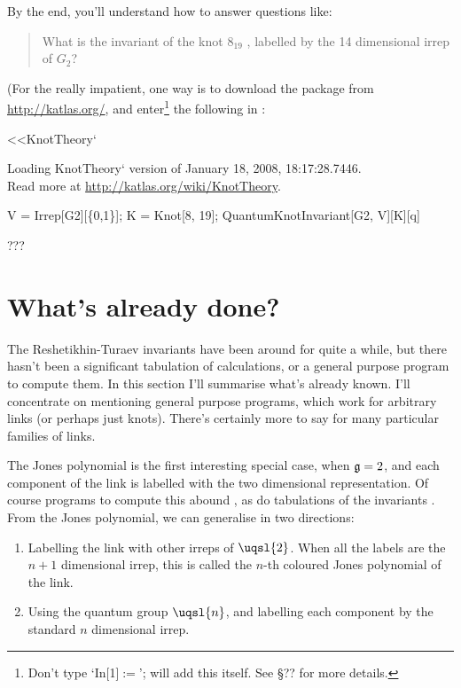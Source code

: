 By the end, you'll understand how to answer questions like:
\begin{quote}
What is the invariant of the knot $8_{19}$ , labelled by
the 14 dimensional irrep of $G_2$?
\end{quote}
(For the really impatient, one way is to download the 
\MMA package from \url{http://katlas.org/}, and enter\footnote{Don't type `{\color{blue}In[1]$:=$}'; \MMA will add this itself. See \S ?? for more details.} the following in \MMA:
\begin{mma}
\begin{inm}<<KnotTheory`\end{inm}
\begin{printm}Loading KnotTheory` version of January 18, 2008, 18:17:28.7446. \\
Read more at \url{http://katlas.org/wiki/KnotTheory}.
\end{printm}
\begin{inm}V = Irrep[G2][\{0,1\}]; K = Knot[8, 19];
QuantumKnotInvariant[G2, V][K][q]\end{inm} 
\begin{outm}???\end{outm}
\end{mma}

\section{What's already done?}
The Reshetikhin-Turaev invariants have been around for quite a while, but
there hasn't been a significant tabulation of calculations, or a general
purpose program to compute them. In this section I'll summarise what's
already known. I'll concentrate on mentioning general purpose programs,
which work for arbitrary links (or perhaps just knots). There's certainly
more to say for many particular families of links.

The Jones polynomial \cite{???} is the first interesting special case,
when $\mathfrak{g}=\sl{2}$, and each component of the link is labelled
with the two dimensional representation. Of course programs to compute
this abound \cite{???}, as do tabulations of the invariants \cite{???}.
From the Jones polynomial, we can generalise in two directions:
\begin{enumerate}
\item Labelling the link with other irreps of $\uqsl{2}$. When all the
labels are the $n+1$ dimensional irrep, this is called the $n$-th
coloured Jones polynomial of the link.
\item Using the quantum group $\uqsl{n}$, and labelling each component by
the standard $n$ dimensional irrep.
\end{enumerate}

